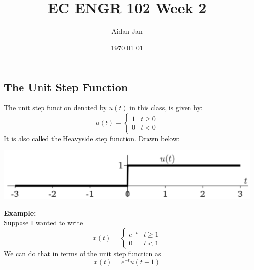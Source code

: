 \documentclass[10pt]{article}
\title{EC ENGR 102 Week 2}
\author{Aidan Jan}
\date{\today}
\newcommand{\example}{\textbf{Example: }}
\begin{document}
\maketitle
\subsection*{The Unit Step Function}
The unit step function denoted by $u(t)$ in this class, is given by:
\[u(t) = \begin{cases} 1 & t \geq 0 \\ 0 & t < 0 \end{cases}\]
It is also called the Heavyside step function.  Drawn below:
\begin{center}
    \includegraphics[scale=0.9]{W2_1.png}
\end{center}
\example\\
Suppose I wanted to write
\[x(t) = \begin{cases}e^{-t} & t \geq 1 \\ 0 & t < 1\end{cases}\]
We can do that in terms of the unit step function as
\[x(t) = e^{-t} u(t - 1)\]
\end{document}
